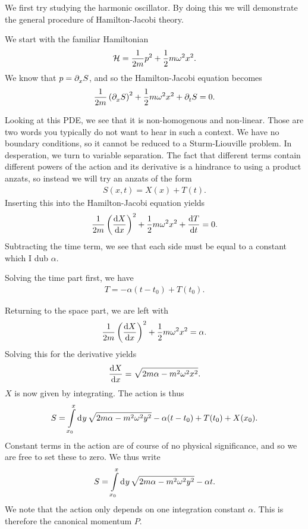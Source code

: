 We first try studying the harmonic oscillator. By doing this we will demonstrate the general procedure of Hamilton-Jacobi theory.

We start with the familiar Hamiltonian
\begin{align*}
	\mathcal{H} = \frac{1}{2m}p^{2} + \frac{1}{2}m\omega^{2}x^{2}.
\end{align*}
We know that $p = \partial^{}_{x}S$, and so the Hamilton-Jacobi equation becomes
\begin{align*}
	\frac{1}{2m}\left(\partial^{}_{x}S\right)^{2} + \frac{1}{2}m\omega^{2}x^{2} + \partial^{}_{t}S = 0.
\end{align*}

Looking at this PDE, we see that it is non-homogenous and non-linear. Those are two words you typically do not want to hear in such a context. We have no boundary conditions, so it cannot be reduced to a Sturm-Liouville problem. In desperation, we turn to variable separation. The fact that different terms contain different powers of the action and its derivative is a hindrance to using a product anzats, so instead we will try an anzats of the form
\begin{align*}
	S(x, t) = X(x) + T(t).
\end{align*}
Inserting this into the Hamilton-Jacobi equation yields
\begin{align*}
	\frac{1}{2m}\left(\dv{X}{x}\right)^{2} + \frac{1}{2}m\omega^{2}x^{2} + \dv{T}{t} = 0.
\end{align*}
Subtracting the time term, we see that each side must be equal to a constant which I dub $\alpha$.

Solving the time part first, we have
\begin{align*}
	T = -\alpha(t - t_{0}) + T(t_{0}).
\end{align*}

Returning to the space part, we are left with
\begin{align*}
	\frac{1}{2m}\left(\dv{X}{x}\right)^{2} + \frac{1}{2}m\omega^{2}x^{2} = \alpha.
\end{align*}
Solving this for the derivative yields
\begin{align*}
	\dv{X}{x} = \sqrt{2m\alpha - m^{2}\omega^{2}x^{2}}.
\end{align*}
$X$ is now given by integrating. The action is thus
\begin{align*}
	S = \int\limits_{x_{0}}^{x}\dd[]{y}\sqrt{2m\alpha - m^{2}\omega^{2}y^{2}} - \alpha(t - t_{0}) + T(t_{0}) + X(x_{0}).
\end{align*}
Constant terms in the action are of course of no physical significance, and so we are free to set these to zero. We thus write
\begin{align*}
	S = \int\limits_{x_{0}}^{x}\dd[]{y}\sqrt{2m\alpha - m^{2}\omega^{2}y^{2}} - \alpha t.
\end{align*}
We note that the action only depends on one integration constant $\alpha$. This is therefore the canonical momentum $P$.

